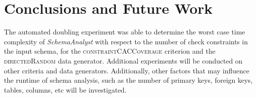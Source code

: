 
\section{Conclusions and Future Work}

The automated doubling experiment was able to determine the worst case time complexity of \textit{SchemaAnalyst} with
respect to the number of check constraints in the input schema, for the \textsc{constraintCACCoverage} criterion and the
\textsc{directedRandom} data generator.  Additional experiments will be conducted on other criteria and data generators.
Additionally, other factors that may influence the runtime of schema analysis, such as the number of primary keys,
foreign keys, tables, columns, etc will be investigated.
